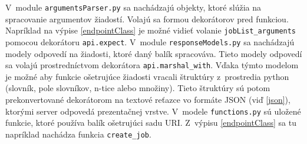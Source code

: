 \documentclass[slovak]{fitthesis}
\begin{document}
V~module \texttt{argumentsParser.py} sa nachádzajú objekty, ktoré slúžia na spracovanie argumentov žiadostí. Volajú sa formou dekorátorov pred funkciou. Napríklad na výpise \ref{endpointClass} je možné vidieť volanie \texttt{jobList\_arguments} pomocou dekorátoru \texttt{api.expect}. V~module \texttt{responseModels.py} sa nachádzajú modely odpovedí na žiadosti, ktoré daný balík spracováva. Tieto modely odpovedí sa volajú prostredníctvom dekorátora \texttt{api.marshal\_with}. Vďaka týmto modelom je možné aby funkcie ošetrujúce žiadosti vracali štruktúry z~prostredia python (slovník, pole slovníkov, n-tice alebo množiny). Tieto štruktúry sú potom prekonvertované dekorátorom na textové reťazce vo formáte JSON (viď \ref{json}), ktorými server odpovedá prezentačnej vrstve. V~modele \texttt{functions.py} sú uložené funkcie, ktoré používa balík ošetrujúci sadu URI. Z~výpisu \ref{endpointClass} sa tu napríklad nachádza funkcia \texttt{create\_job}.
\end{document}
